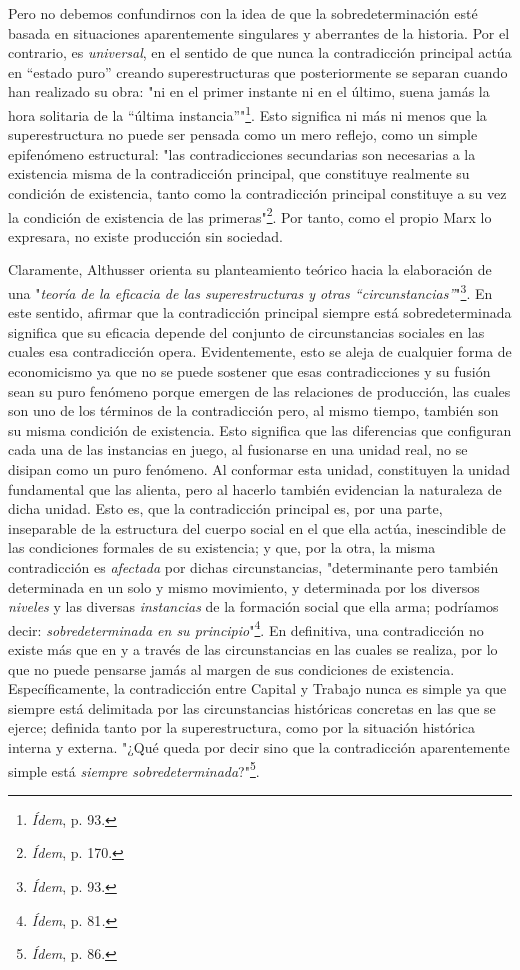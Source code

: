 Pero no debemos confundirnos con la idea de que la sobredeterminación
esté basada en situaciones aparentemente singulares y aberrantes de la
historia. Por el contrario, es \emph{universal}, en el sentido de que
nunca la contradicción principal actúa en ``estado puro'' creando
superestructuras que posteriormente se separan cuando han realizado su
obra: "ni en el primer instante ni en el último, suena jamás la hora
solitaria de la ``última instancia''"\footnote{\emph{Ídem}, p. 93.}.
Esto significa ni más ni menos que la superestructura no puede ser
pensada como un mero reflejo, como un simple epifenómeno estructural:
"las contradicciones secundarias son necesarias a la existencia misma de
la contradicción principal, que constituye realmente su condición de
existencia, tanto como la contradicción principal constituye a su vez la
condición de existencia de las primeras"\footnote{\emph{Ídem}, p. 170.}.
Por tanto, como el propio Marx lo expresara, no existe producción sin
sociedad.

Claramente, Althusser orienta su planteamiento teórico hacia la
elaboración de una "\emph{teoría de la eficacia de las superestructuras
y otras ``circunstancias''}"\footnote{\emph{Ídem}, p. 93.}. En este
sentido, afirmar que la contradicción principal siempre está
sobredeterminada significa que su eficacia depende del conjunto de
circunstancias sociales en las cuales esa contradicción opera.
Evidentemente, esto se aleja de cualquier forma de economicismo ya que
no se puede sostener que esas contradicciones y su fusión sean su puro
fenómeno porque emergen de las relaciones de producción, las cuales son
uno de los términos de la contradicción pero, al mismo tiempo, también
son su misma condición de existencia. Esto significa que las diferencias
que configuran cada una de las instancias en juego, al fusionarse en una
unidad real, no se disipan como un puro fenómeno. Al conformar esta
unidad\emph{,} constituyen la unidad fundamental que las alienta, pero
al hacerlo también evidencian la naturaleza de dicha unidad. Esto es,
que la contradicción principal es, por una parte, inseparable de la
estructura del cuerpo social en el que ella actúa, inescindible de las
condiciones formales de su existencia; y que, por la otra, la misma
contradicción es \emph{afectada} por dichas circunstancias,
"determinante pero también determinada en un solo y mismo movimiento, y
determinada por los diversos \emph{niveles} y las diversas
\emph{instancias} de la formación social que ella arma; podríamos decir:
\emph{sobredeterminada en su principio}"\footnote{\emph{Ídem}, p.
  81\emph{.}}. En definitiva, una contradicción no existe más que en y a
través de las circunstancias en las cuales se realiza, por lo que no
puede pensarse jamás al margen de sus condiciones de existencia.
Específicamente, la contradicción entre Capital y Trabajo nunca es
simple ya que siempre está delimitada por las circunstancias históricas
concretas en las que se ejerce; definida tanto por la superestructura,
como por la situación histórica interna y externa. "¿Qué queda por decir
sino que la contradicción aparentemente simple está \emph{siempre
sobredeterminada}?"\footnote{\emph{Ídem}, p. 86.}.

